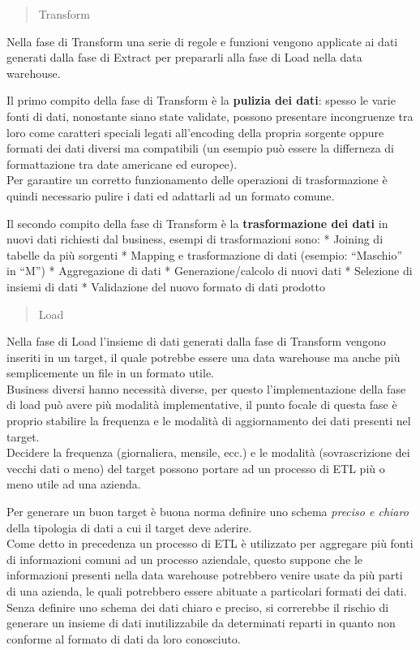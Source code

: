 \documentclass[]{article}
\begin{document}
\begin{quote}
Transform
\end{quote}

Nella fase di Transform una serie di regole e funzioni vengono applicate
ai dati generati dalla fase di Extract per prepararli alla fase di Load
nella data warehouse.

Il primo compito della fase di Transform è la \textbf{pulizia dei dati}:
spesso le varie fonti di dati, nonostante siano state validate, possono
presentare incongruenze tra loro come caratteri speciali legati
all'encoding della propria sorgente oppure formati dei dati diversi ma
compatibili (un esempio può essere la differneza di formattazione tra
date americane ed europee).\\
Per garantire un corretto funzionamento delle operazioni di
trasformazione è quindi necessario pulire i dati ed adattarli ad un
formato comune.

Il secondo compito della fase di Transform è la \textbf{trasformazione
dei dati} in nuovi dati richiesti dal business, esempi di trasformazioni
sono: * Joining di tabelle da più sorgenti * Mapping e trasformazione di
dati (esempio: ``Maschio'' in ``M'') * Aggregazione di dati *
Generazione/calcolo di nuovi dati * Selezione di insiemi di dati *
Validazione del nuovo formato di dati prodotto

\begin{quote}
Load
\end{quote}

Nella fase di Load l'insieme di dati generati dalla fase di Transform
vengono inseriti in un target, il quale potrebbe essere una data
warehouse ma anche più semplicemente un file in un formato utile.\\
Business diversi hanno necessità diverse, per questo l'implementazione
della fase di load può avere più modalità implementative, il punto
focale di questa fase è proprio stabilire la frequenza e le modalità di
aggiornamento dei dati presenti nel target.\\
Decidere la frequenza (giornaliera, mensile, ecc.) e le modalità
(sovrascrizione dei vecchi dati o meno) del target possono portare ad un
processo di ETL più o meno utile ad una azienda.

Per generare un buon target è buona norma definire uno schema
\emph{preciso e chiaro} della tipologia di dati a cui il target deve
aderire.\\
Come detto in precedenza un processo di ETL è utilizzato per aggregare
più fonti di informazioni comuni ad un processo aziendale, questo
suppone che le informazioni presenti nella data warehouse potrebbero
venire usate da più parti di una azienda, le quali potrebbero essere
abituate a particolari formati dei dati.\\
Senza definire uno schema dei dati chiaro e preciso, si correrebbe il
rischio di generare un insieme di dati inutilizzabile da determinati
reparti in quanto non conforme al formato di dati da loro conosciuto.
\end{document}
